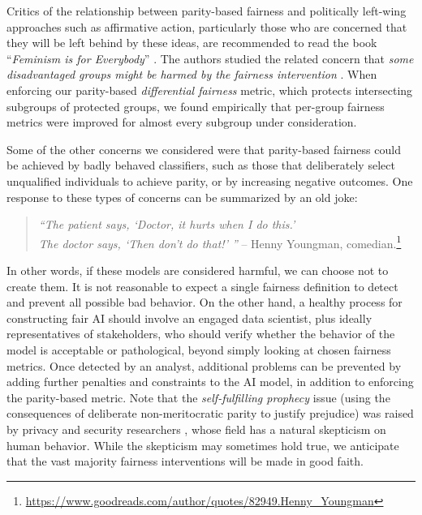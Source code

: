 \documentclass[11pt,dvipdfm]{article}
\begin{document}
Critics of the relationship between parity-based fairness and politically left-wing approaches such as affirmative action, particularly those who are concerned that they will be left behind by these ideas, are recommended to read the book ``\emph{Feminism is for Everybody}'' \cite{hooks2000feminism}.  The authors studied the related concern that \emph{some disadvantaged groups might be harmed by the fairness intervention} \cite{foulds2020intersectional}.  When enforcing our parity-based \emph{differential fairness} metric, which protects intersecting subgroups of protected groups, we found empirically that per-group fairness metrics were improved for almost every subgroup under consideration. 

Some of the other concerns we considered were that parity-based fairness could be achieved by badly behaved classifiers, such as those that deliberately select unqualified individuals to achieve parity, or by increasing negative outcomes.  One response to these types of concerns can be summarized by an old joke:
\begin{quote}
\emph{
``The patient says, `Doctor, it hurts when I do this.' \\
The doctor says, `Then don't do that!' ''} -- Henny Youngman, comedian.\footnote{\url{https://www.goodreads.com/author/quotes/82949.Henny_Youngman}}
\end{quote}
In other words, if these models are considered harmful, we can choose not to create them.    It is not reasonable to expect a single fairness definition to detect and prevent all possible bad behavior.  On the other hand, a healthy process for constructing fair AI should involve an engaged data scientist, plus ideally representatives of stakeholders, who should verify whether the behavior of the model is acceptable or pathological, beyond simply looking at chosen fairness metrics.  Once detected by an analyst, additional problems can be prevented by adding further penalties and constraints to the AI model, in addition to enforcing the parity-based metric.  Note that the \emph{self-fulfilling prophecy} issue (using the consequences of deliberate non-meritocratic parity to justify prejudice) was raised by privacy and security researchers \cite{dwork2012fairness}, whose field has a natural skepticism on human behavior.  While the skepticism may sometimes hold true, we anticipate that the vast majority fairness interventions will be made in good faith. 
\end{document}
